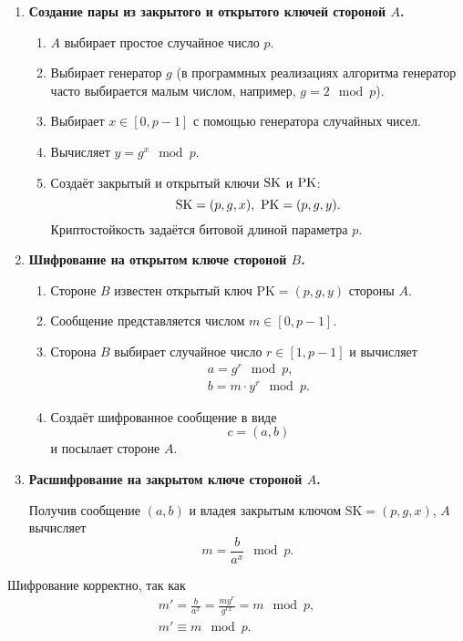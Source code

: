 \begin{enumerate}
    \item \textbf{Создание пары из закрытого и открытого ключей стороной $A$.}
        \begin{enumerate}
            \item $A$ выбирает простое случайное число $p$.
            \item Выбирает генератор $g$ (в программных реализациях алгоритма генератор часто выбирается малым числом, например, $g = 2 \mod p$).
            \item Выбирает $x \in [0, p - 1]$ с помощью генератора случайных чисел.
            \item Вычисляет $y=g^{x}\mod p$.
            \item Создаёт закрытый и открытый ключи $\textrm{SK}$ и $\textrm{PK}$:
                \[ \textrm{SK} = (p, g, x), ~ \textrm{PK} = (p, g, y). \]
                Криптостойкость задаётся битовой длиной параметра $p$.
        \end{enumerate}
    \item \textbf{Шифрование на открытом ключе стороной $B$.}
        \begin{enumerate}
            \item Стороне $B$ известен открытый ключ $\text{PK} = (p, g, y)$ стороны $A$.
            \item Сообщение представляется числом $m \in [0, p-1]$.
            \item Сторона $B$ выбирает случайное число $r \in [1, p-1]$ и вычисляет
                \[ \begin{array}{l}
                    a = g^r \mod p, \\
                    b = m \cdot y^r \mod p.
                \end{array} \]
            \item Создаёт шифрованное сообщение в виде
                \[ c = (a, b) \]
                и посылает стороне $A$.
        \end{enumerate}
    \item \textbf{Расшифрование на закрытом ключе стороной $A$.}

	Получив сообщение $(a, b)$ и владея закрытым ключом $\text{SK} = (p, g, x)$, $A$ вычисляет
                \[ m = \frac{b}{a^x} \mod p. \]
\end{enumerate}

Шифрование корректно, так как 
\[ \begin{array}{l}
    m' = \frac{b}{a^x} = \frac{m y^r}{g^{rx}} = m \mod p, \\
    m' \equiv m \mod p.
\end{array} \]

